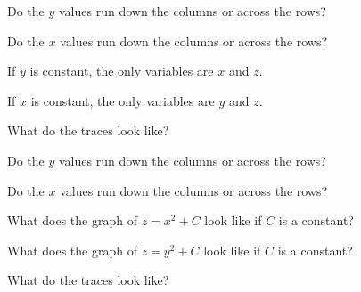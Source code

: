 \begin{smallhint}
\ba
\item Do the $y$ values run down the columns or across the rows?
\item Do the $x$ values run down the columns or across the rows?
\item If $y$ is constant, the only variables are $x$ and $z$. 
\item If $x$ is constant, the only variables are $y$ and $z$.
\item What do the traces look like?
\ea 
\end{smallhint}
\begin{bighint}
\ba
\item Do the $y$ values run down the columns or across the rows?
\item Do the $x$ values run down the columns or across the rows?
\item What does the graph of $z=x^2+C$ look like if $C$ is a constant?
\item What does the graph of $z=y^2+C$ look like if $C$ is a constant?
\item What do the traces look like?
\ea
\end{bighint}
